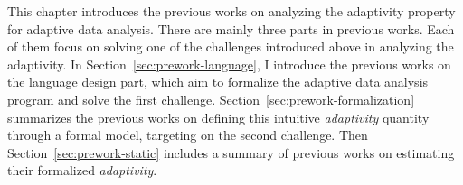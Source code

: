 This chapter introduces the previous works on analyzing the adaptivity property
for adaptive data analysis.
There are mainly three parts in previous works.
Each of them focus on solving one of the challenges introduced above in analyzing the adaptivity.
In Section~\ref{sec:prework-language}, I introduce the previous works on the language design part, which aim to formalize
the adaptive data analysis program and solve the first challenge.
Section~\ref{sec:prework-formalization} summarizes the previous works
on defining this intuitive \emph{adaptivity} quantity through a formal model,
targeting on the second challenge.
Then Section~\ref{sec:prework-static} includes a summary of previous works on estimating
their formalized \emph{adaptivity}.
